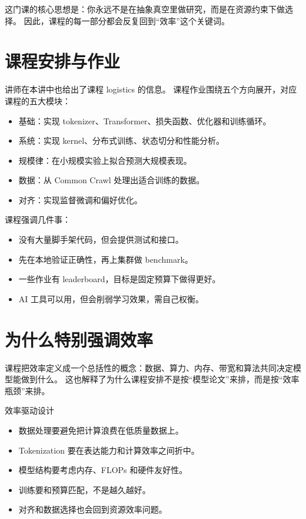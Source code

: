 \documentclass[a4paper]{article}
\begin{document}
这门课的核心思想是：你永远不是在抽象真空里做研究，而是在资源约束下做选择。
因此，课程的每一部分都会反复回到“效率”这个关键词。

\section{课程安排与作业}

讲师在本讲中也给出了课程 logistics 的信息。
课程作业围绕五个方向展开，对应课程的五大模块：
\begin{itemize}
    \item 基础：实现 tokenizer、Transformer、损失函数、优化器和训练循环。
    \item 系统：实现 kernel、分布式训练、状态切分和性能分析。
    \item 规模律：在小规模实验上拟合预测大规模表现。
    \item 数据：从 Common Crawl 处理出适合训练的数据。
    \item 对齐：实现监督微调和偏好优化。
\end{itemize}

课程强调几件事：
\begin{itemize}
    \item 没有大量脚手架代码，但会提供测试和接口。
    \item 先在本地验证正确性，再上集群做 benchmark。
    \item 一些作业有 leaderboard，目标是固定预算下做得更好。
    \item AI 工具可以用，但会削弱学习效果，需自己权衡。
\end{itemize}

\section{为什么特别强调效率}

课程把效率定义成一个总括性的概念：数据、算力、内存、带宽和算法共同决定模型能做到什么。
这也解释了为什么课程安排不是按“模型论文”来排，而是按“效率瓶颈”来排。

\begin{importantbox}{效率驱动设计}
\begin{itemize}
    \item 数据处理要避免把计算浪费在低质量数据上。
    \item Tokenization 要在表达能力和计算效率之间折中。
    \item 模型结构要考虑内存、FLOPs 和硬件友好性。
    \item 训练要和预算匹配，不是越久越好。
    \item 对齐和数据选择也会回到资源效率问题。
\end{itemize}
\end{importantbox}
\end{document}
